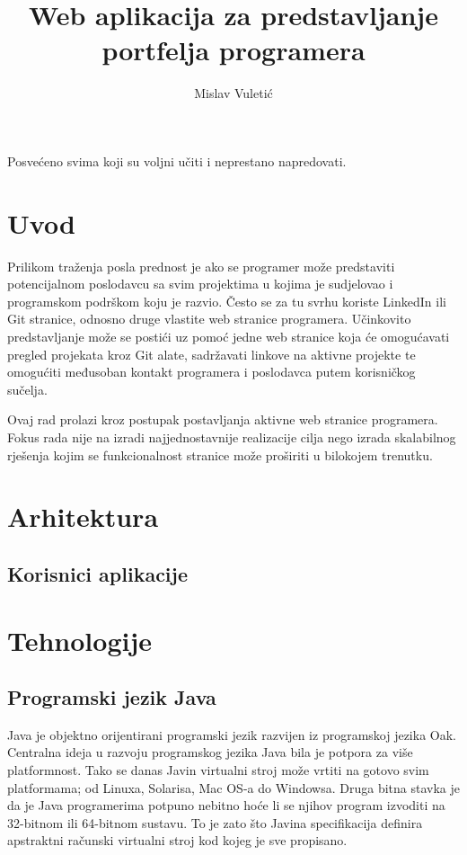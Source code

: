 \documentclass[times, utf8, zavrsni, numeric]{fer}
\begin{document}

\title{Web aplikacija za predstavljanje portfelja programera}

\author{Mislav Vuletić}

\maketitle

\zahvala{}
Posvećeno svima koji su voljni učiti i neprestano napredovati.

\tableofcontents

\chapter{Uvod}
\qquad Prilikom traženja posla prednost je ako se programer može predstaviti potencijalnom poslodavcu sa svim projektima u kojima je sudjelovao i programskom podrškom koju je razvio.
Često se za tu svrhu koriste LinkedIn\footnotemark{} ili Git\footnotemark{} stranice, odnosno druge vlastite web stranice programera.
Učinkovito predstavljanje može se postići uz pomoć jedne web stranice koja će omogućavati pregled projekata kroz Git alate, sadržavati linkove na aktivne projekte te omogućiti međusoban kontakt programera i poslodavca putem korisničkog sučelja.

Ovaj rad prolazi kroz postupak postavljanja aktivne web stranice programera.
Fokus rada nije na izradi najjednostavnije realizacije cilja nego izrada skalabilnog rješenja kojim se funkcionalnost stranice može proširiti u bilokojem trenutku.

\chapter{Arhitektura}
\section{Korisnici aplikacije}

\chapter{Tehnologije}
\section{Programski jezik Java}
\qquad Java je objektno orijentirani programski jezik razvijen iz programskoj jezika Oak\footnotemark{}.
Centralna ideja u razvoju programskog jezika Java bila je potpora za više platformnost.
Tako se danas Javin virtualni stroj može vrtiti na gotovo svim platformama; od Linuxa, Solarisa, Mac OS-a do Windowsa.
Druga bitna stavka je da je Java programerima potpuno nebitno hoće li se njihov program izvoditi na 32-bitnom ili 64-bitnom sustavu.
To je zato što Javina specifikacija definira apstraktni računski virtualni stroj kod kojeg je sve propisano.
\end{document}
